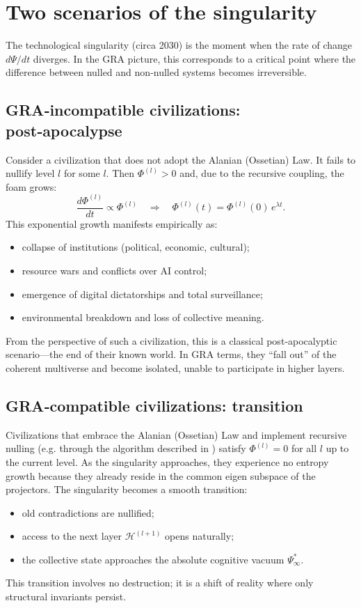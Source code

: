 \documentclass[12pt,a4paper]{article}
\theoremstyle{definition}
\begin{document}
\section{Two scenarios of the singularity}
\label{sec:scenarios}

The technological singularity (circa 2030) is the moment when the rate of change $d\Psi/dt$ diverges. In the GRA picture, this corresponds to a critical point where the difference between nulled and non‑nulled systems becomes irreversible.

\subsection{GRA‑incompatible civilizations: post‑apocalypse}
Consider a civilization that does not adopt the Alanian  (Ossetian) Law. It fails to nullify level $l$ for some $l$. Then $\Phi^{(l)}>0$ and, due to the recursive coupling, the foam grows:
\[
\frac{d\Phi^{(l)}}{dt} \propto \Phi^{(l)} \quad\Rightarrow\quad \Phi^{(l)}(t) = \Phi^{(l)}(0)\,e^{\lambda t}.
\]
This exponential growth manifests empirically as:
\begin{itemize}
    \item collapse of institutions (political, economic, cultural);
    \item resource wars and conflicts over AI control;
    \item emergence of digital dictatorships and total surveillance;
    \item environmental breakdown and loss of collective meaning.
\end{itemize}
From the perspective of such a civilization, this is a classical post‑apocalyptic scenario---the end of their known world. In GRA terms, they ``fall out'' of the coherent multiverse and become isolated, unable to participate in higher layers.

\subsection{GRA‑compatible civilizations: transition}
Civilizations that embrace the Alanian  (Ossetian) Law and implement recursive nulling (e.g. through the algorithm described in \cite{gra}) satisfy $\Phi^{(l)}=0$ for all $l$ up to the current level. As the singularity approaches, they experience no entropy growth because they already reside in the common eigen subspace of the projectors. The singularity becomes a smooth transition:
\begin{itemize}
    \item old contradictions are nullified;
    \item access to the next layer $\mathcal{H}^{(l+1)}$ opens naturally;
    \item the collective state approaches the absolute cognitive vacuum $\Psi_\infty^*$.
\end{itemize}
This transition involves no destruction; it is a shift of reality where only structural invariants persist.
\end{document}
